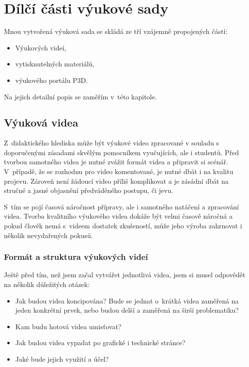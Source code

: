 \chapter{Dílčí části výukové sady}
Mnou vytvořená výuková sada se skládá ze tří vzájemně propojených částí:
\begin{itemize}[topsep=0pt]
    \setlength\itemsep{0em}
    \item Výukových videí,
    \item vytisknutelných materiálů,
    \item výukového portálu P3D.
\end{itemize}
Na jejich detailní popis se zaměřím v~této kapitole.

\section{Výuková videa}
Z~didaktického hlediska může být výukové video zpracované v souladu s doporučenými zásadami skvělým pomocníkem vyučujících, ale i studentů.
Před tvorbou samotného videa je nutné zvážit formát videa a připravit si scénář.
V~případě, že se rozhodnu pro video komentované, je nutné dbát i na kvalitu projevu.
Zároveň není žádoucí video příliš komplikovat a je zásádní dbát na stručné a jasné objasnění předváděného postupu, či jevu.

S~tím se pojí časová náročnost přípravy, ale i samotného natáčení a zpracování videa.
Tvorba kvalitního výukového videa dokáže být velmi časově náročná a pokud člověk nemá s~videem dostatek zkušeností, může jeho výroba zahrnovat i několik nevydařených pokusů.

\subsection{Formát a struktura výukových videí}
Ještě před tím, než jsem začal vytvářet jednotlivá videa, jsem si musel odpovědět na několik důležitých otázek:
\begin{itemize}[topsep=0pt]
    \setlength\itemsep{0em}
    \item Jak budou videa koncipována? Bude se jednat o~krátká videa zaměřená na jeden konkrétní prvek, nebo budou delší a zaměřená na širší problematiku?
    \item Kam budu hotová videa umisťovat?
    \item Jak budou videa vypadat po grafické i technické stránce?
    \item Jaké bude jejich využití a účel?
\end{itemize}

